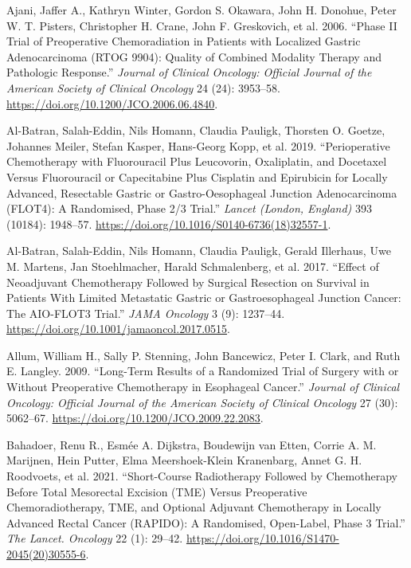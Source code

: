 \documentclass[
  letterpaper,
]{scrbook}
\newlength{\cslhangindent}
\newenvironment{CSLReferences}[2] %
 {\begin{list}{}{%
  \setlength{\itemindent}{0pt}
  \setlength{\leftmargin}{0pt}
  \setlength{\parsep}{0pt}
  \ifodd #1
   \setlength{\leftmargin}{\cslhangindent}
   \setlength{\itemindent}{-1\cslhangindent}
  \fi
  \setlength{\itemsep}{#2\baselineskip}}}
 {\end{list}}
\begin{document}
\label{refs}
\begin{CSLReferences}{1}{0}
Ajani, Jaffer A., Kathryn Winter, Gordon S. Okawara, John H. Donohue,
Peter W. T. Pisters, Christopher H. Crane, John F. Greskovich, et al.
2006. {``Phase {II} Trial of Preoperative Chemoradiation in Patients
with Localized Gastric Adenocarcinoma ({RTOG} 9904): Quality of Combined
Modality Therapy and Pathologic Response.''} \emph{Journal of Clinical
Oncology: Official Journal of the American Society of Clinical Oncology}
24 (24): 3953--58. \url{https://doi.org/10.1200/JCO.2006.06.4840}.

Al-Batran, Salah-Eddin, Nils Homann, Claudia Pauligk, Thorsten O.
Goetze, Johannes Meiler, Stefan Kasper, Hans-Georg Kopp, et al. 2019.
{``Perioperative Chemotherapy with Fluorouracil Plus Leucovorin,
Oxaliplatin, and Docetaxel Versus Fluorouracil or Capecitabine Plus
Cisplatin and Epirubicin for Locally Advanced, Resectable Gastric or
Gastro-Oesophageal Junction Adenocarcinoma ({FLOT4}): A Randomised,
Phase 2/3 Trial.''} \emph{Lancet (London, England)} 393 (10184):
1948--57. \url{https://doi.org/10.1016/S0140-6736(18)32557-1}.

Al-Batran, Salah-Eddin, Nils Homann, Claudia Pauligk, Gerald Illerhaus,
Uwe M. Martens, Jan Stoehlmacher, Harald Schmalenberg, et al. 2017.
{``Effect of {Neoadjuvant} {Chemotherapy} {Followed} by {Surgical}
{Resection} on {Survival} in {Patients} {With} {Limited} {Metastatic}
{Gastric} or {Gastroesophageal} {Junction} {Cancer}: {The} {AIO}-{FLOT3}
{Trial}.''} \emph{JAMA Oncology} 3 (9): 1237--44.
\url{https://doi.org/10.1001/jamaoncol.2017.0515}.

Allum, William H., Sally P. Stenning, John Bancewicz, Peter I. Clark,
and Ruth E. Langley. 2009. {``Long-Term Results of a Randomized Trial of
Surgery with or Without Preoperative Chemotherapy in Esophageal
Cancer.''} \emph{Journal of Clinical Oncology: Official Journal of the
American Society of Clinical Oncology} 27 (30): 5062--67.
\url{https://doi.org/10.1200/JCO.2009.22.2083}.

Bahadoer, Renu R., Esmée A. Dijkstra, Boudewijn van Etten, Corrie A. M.
Marijnen, Hein Putter, Elma Meershoek-Klein Kranenbarg, Annet G. H.
Roodvoets, et al. 2021. {``Short-Course Radiotherapy Followed by
Chemotherapy Before Total Mesorectal Excision ({TME}) Versus
Preoperative Chemoradiotherapy, {TME}, and Optional Adjuvant
Chemotherapy in Locally Advanced Rectal Cancer ({RAPIDO}): A Randomised,
Open-Label, Phase 3 Trial.''} \emph{The Lancet. Oncology} 22 (1):
29--42. \url{https://doi.org/10.1016/S1470-2045(20)30555-6}.


\end{CSLReferences}
\end{document}
